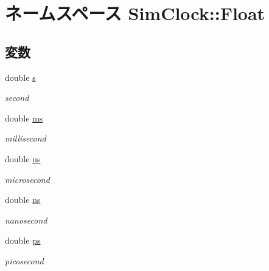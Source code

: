 \hypertarget{namespaceSimClock_1_1Float}{
\section{ネームスペース SimClock::Float}
\label{namespaceSimClock_1_1Float}
}
\subsection*{変数}
\begin{Indent}{\bf }\par
{\em \label{_amgrpd41d8cd98f00b204e9800998ecf8427e}
 }\begin{DoxyCompactItemize}
\item 
double \hyperlink{namespaceSimClock_1_1Float_ad62e712560f6344b96d4c080a2ba9c92}{s}
\begin{DoxyCompactList}\small\item\em second \item\end{DoxyCompactList}\item 
double \hyperlink{namespaceSimClock_1_1Float_ac0c30c1e98c242e3e868c424886912e5}{ms}
\begin{DoxyCompactList}\small\item\em millisecond \item\end{DoxyCompactList}\item 
double \hyperlink{namespaceSimClock_1_1Float_ae7c3f130041d41277e5d8509f85fa4c6}{us}
\begin{DoxyCompactList}\small\item\em microsecond \item\end{DoxyCompactList}\item 
double \hyperlink{namespaceSimClock_1_1Float_a476bed566643072ee0ed28f78d0db370}{ns}
\begin{DoxyCompactList}\small\item\em nanosecond \item\end{DoxyCompactList}\item 
double \hyperlink{namespaceSimClock_1_1Float_a2b58822b2dc20f33784218fa3dd7f7e5}{ps}
\begin{DoxyCompactList}\small\item\em picosecond \item\end{DoxyCompactList}\item 

\end{DoxyCompactItemize}
\end{Indent}
